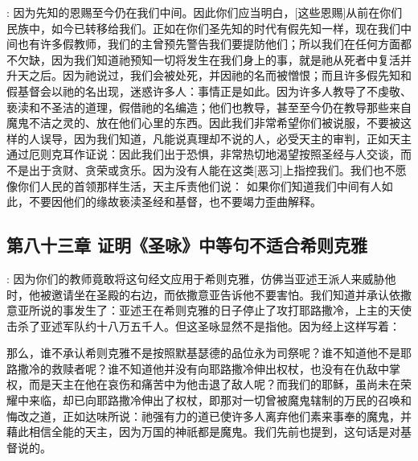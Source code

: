 : 因为先知的恩赐至今仍在我们中间。因此你们应当明白，[这些恩赐]从前在你们民族中，如今已转移给我们。正如在你们圣先知的时代有假先知一样，现在我们中间也有许多假教师，我们的主曾预先警告我们要提防他们；所以我们在任何方面都不欠缺，因为我们知道祂预知一切将发生在我们身上的事，就是祂从死者中复活并升天之后。因为祂说过，我们会被处死，并因祂的名而被憎恨；而且许多假先知和假基督会以祂的名出现，迷惑许多人：事情正是如此。因为许多人教导了不虔敬、亵渎和不圣洁的道理，假借祂的名编造；他们也教导，甚至至今仍在教导那些来自魔鬼不洁之灵的、放在他们心里的东西。因此我们非常希望你们被说服，不要被这样的人误导，因为我们知道，凡能说真理却不说的人，必受天主的审判，正如天主通过厄则克耳作证说：因此我们出于恐惧，非常热切地渴望按照圣经与人交谈，而不是出于贪财、贪荣或贪乐。因为没有人能在这类[恶习]上指控我们。我们也不愿像你们人民的首领那样生活，天主斥责他们说： 如果你们知道我们中间有人如此，不要因他们的缘故亵渎圣经和基督，也不要竭力歪曲解释。\par


\subsection{第八十三章 证明《圣咏》中等句不适合希则克雅}

: 因为你们的教师竟敢将这句经文应用于希则克雅，仿佛当亚述王派人来威胁他时，他被邀请坐在圣殿的右边，而依撒意亚告诉他不要害怕。我们知道并承认依撒意亚所说的事发生了：亚述王在希则克雅的日子停止了攻打耶路撒冷，上主的天使击杀了亚述军队约十八万五千人。但这圣咏显然不是指他。因为经上这样写着：\par

\par

那么，谁不承认希则克雅不是按照默基瑟德的品位永为司祭呢？谁不知道他不是耶路撒冷的救赎者呢？谁不知道他并没有向耶路撒冷伸出权杖，也没有在仇敌中掌权，而是天主在他在哀伤和痛苦中为他击退了敌人呢？而我们的耶稣，虽尚未在荣耀中来临，却已向耶路撒冷伸出了权杖，即那对一切曾被魔鬼辖制的万民的召唤和悔改之道，正如达味所说：祂强有力的道已使许多人离弃他们素来事奉的魔鬼，并藉此相信全能的天主，因为万国的神祇都是魔鬼。我们先前也提到，这句话是对基督说的。\par

